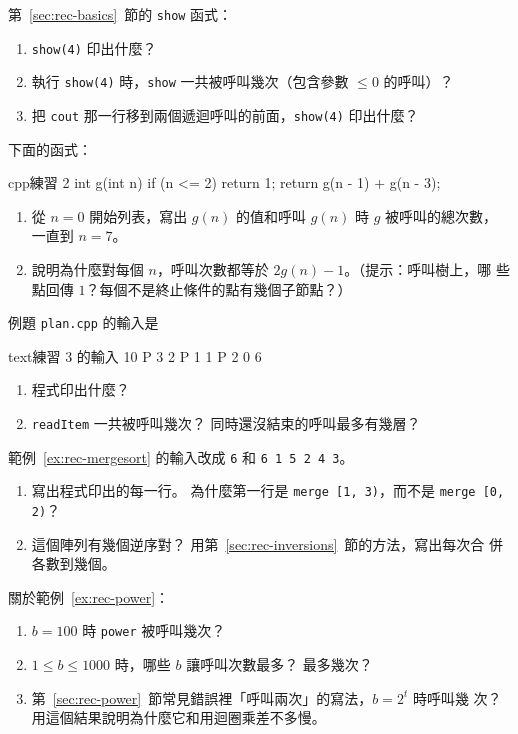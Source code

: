 \begin{drills}[label=drills:ch8]
\item 第~\ref{sec:rec-basics}~節的 \texttt{show} 函式：
\begin{enumerate}
\item \texttt{show(4)} 印出什麼？
\item 執行 \texttt{show(4)} 時，\texttt{show} 一共被呼叫幾次（包含參數
$\le 0$ 的呼叫）？
\item 把 \texttt{cout} 那一行移到兩個遞迴呼叫的前面，\texttt{show(4)} 印出什麼？
\end{enumerate}

\item 下面的函式：
\begin{code}{cpp}{練習 2}
int g(int n) {
    if (n <= 2) {
        return 1;
    }
    return g(n - 1) + g(n - 3);
}
\end{code}
\begin{enumerate}
\item 從 $n = 0$ 開始列表，寫出 $g(n)$ 的值和呼叫 $g(n)$ 時 $g$ 被呼叫的總次數，
一直到 $n = 7$。
\item 說明為什麼對每個 $n$，呼叫次數都等於 $2g(n) - 1$。（提示：呼叫樹上，哪
些點回傳 $1$？每個不是終止條件的點有幾個子節點？）
\end{enumerate}

\item 例題 \texttt{plan.cpp} 的輸入是
\begin{code}{text}{練習 3 的輸入}
10
P 3 2 P 1 1 P 2 0 6
\end{code}
\begin{enumerate}
\item 程式印出什麼？
\item \texttt{readItem} 一共被呼叫幾次？ 同時還沒結束的呼叫最多有幾層？
\end{enumerate}

\item 範例~\ref{ex:rec-mergesort} 的輸入改成 \texttt{6} 和 \texttt{6 1 5 2 4 3}。
\begin{enumerate}
\item 寫出程式印出的每一行。 為什麼第一行是 \texttt{merge [1, 3)}，而不是
\texttt{merge [0, 2)}？
\item 這個陣列有幾個逆序對？ 用第~\ref{sec:rec-inversions}~節的方法，寫出每次合
併各數到幾個。
\end{enumerate}

\item 關於範例~\ref{ex:rec-power}：
\begin{enumerate}
\item $b = 100$ 時 \texttt{power} 被呼叫幾次？
\item $1 \le b \le 1000$ 時，哪些 $b$ 讓呼叫次數最多？ 最多幾次？
\item 第~\ref{sec:rec-power}~節常見錯誤裡「呼叫兩次」的寫法，$b = 2^t$ 時呼叫幾
次？ 用這個結果說明為什麼它和用迴圈乘差不多慢。
\end{enumerate}

\end{drills}

